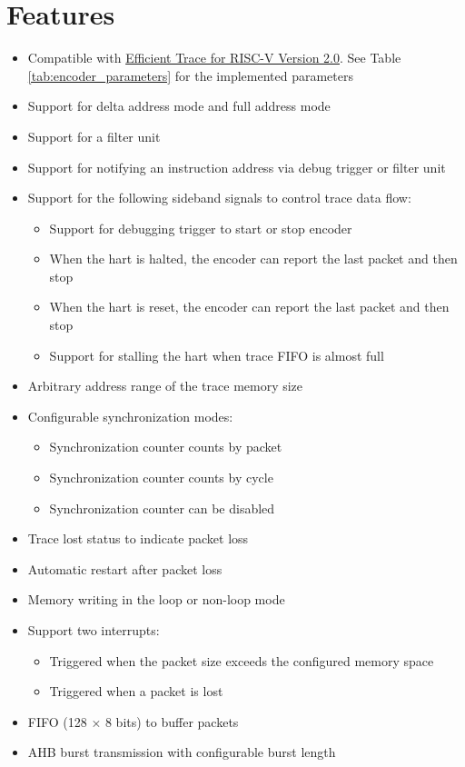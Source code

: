 \documentclass[main\_\_EN.tex]{subfiles}
\begin{document}

\section{Features}
\label{sec:riscvtracenc-features}

\begin{itemize}
    \item Compatible with \href{https://github.com/riscv-non-isa/riscv-trace-spec/releases}{Efficient Trace for RISC-V Version 2.0}. See Table \ref{tab:encoder_parameters} for the implemented parameters
    \item Support for delta address mode and full address mode
    \item Support for a filter unit
    \item Support for notifying an instruction address via debug trigger or filter unit
    \item Support for the following sideband signals to control trace data flow:
        \begin{itemize}
            \item Support for debugging trigger to start or stop encoder
            \item When the hart is halted, the encoder can report the last packet and then stop
            \item When the hart is reset, the encoder can report the last packet and then stop
            \item Support for stalling the hart when trace FIFO is almost full
        \end{itemize}
    \item Arbitrary address range of the trace memory size
    \item Configurable synchronization modes:
        \begin{itemize}
            \item Synchronization counter counts by packet
            \item Synchronization counter counts by cycle
            \item Synchronization counter can be disabled
        \end{itemize}
    \item Trace lost status to indicate packet loss
    \item Automatic restart after packet loss
    \item Memory writing in the loop or non-loop mode
    \item Support two interrupts:
        \begin{itemize}
            \item Triggered when the packet size exceeds the configured memory space
            \item Triggered when a packet is lost
        \end{itemize}
    \item FIFO (128 × 8 bits) to buffer packets
    \item AHB burst transmission with configurable burst length
\end{itemize}
\end{document}

